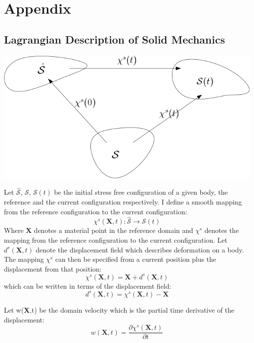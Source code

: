 \chapter{Appendix}
\section{Lagrangian Description of Solid Mechanics}

\begin{center}
\includegraphics[scale=0.4]{continuum_mapping.png}
\end{center}
Let $ \hat{\mathcal{S}}$, $\mathcal{S}$, $\mathcal{S}(t)$ be the initial stress free configuration of a given body, the reference and the current configuration respectively.
I define a smooth mapping from the reference configuration to the current configuration:
\begin{equation}
\chi^s(\textbf{X},t) : \hat{\mathcal{S}} \rightarrow \mathcal{S}(t)     
\end{equation}
Where $\textbf{X}$ denotes a material point in the reference domain and $\chi^s$ denotes the mapping from the reference configuration to the current configuration. Let $d^s(\textbf{X},t)$ denote the displacement field which describes deformation on a body. The mapping $\chi^s$ can then be specified from a current position plus the displacement from that position:
\begin{equation} \label{eq:chi}
 \chi^s(\textbf{X},t) = \textbf{X}  + d^s(\textbf{X} ,t) 
\end{equation}
which can be written in terms of the displacement field:
\begin{equation}
 d^s(\textbf{X},t) = \chi^s(\textbf{X},t) -\textbf{X}   
\end{equation}

Let w(\textbf{X},t) be the domain velocity which is the partial time derivative of the displacement: 
\begin{equation}
 w(\textbf{X},t) = \frac{\partial \chi^s(\textbf{X},t)}{\partial t}   
\end{equation}

